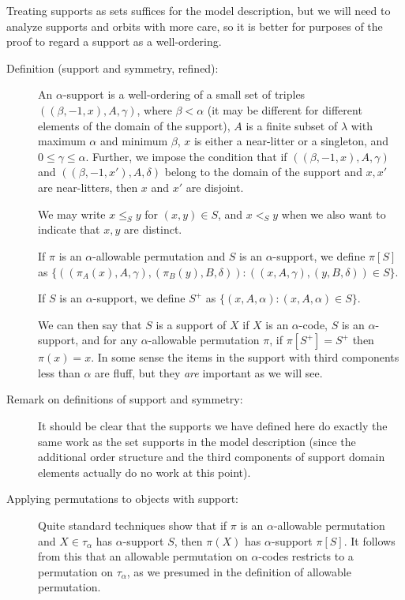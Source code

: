 Treating supports as sets suffices for the model description, but we will need to analyze supports and orbits with more care, so it is better for purposes
of the proof to regard a support as a well-ordering.

\begin{description}

\item[Definition (support and symmetry, refined):]  An $\alpha$-support is a well-ordering of a small set of triples $((\beta,-1,x),A,\gamma)$, where $\beta<\alpha$ (it may be different for different elements of the domain of the support), $A$ is a finite subset of $\lambda$ with maximum $\alpha$ and minimum $\beta$, $x$ is either a near-litter or a singleton, and $0 \leq \gamma \leq\alpha$.  Further, we impose the condition that if $((\beta,-1,x),A,\gamma)$ and $((\beta,-1,x'),A,\delta)$ belong to the domain of the support and $x,x'$ are near-litters, then $x$ and $x'$ are disjoint.

We may write $x \leq_S y$ for $(x,y) \in S$, and $x <_S y$ when we also want to indicate that $x,y$ are distinct.

If $\pi$ is an $\alpha$-allowable permutation and $S$ is an $\alpha$-support, we define $\pi[S]$ as $\{((\pi_A(x),A,\gamma),(\pi_B(y),B,\delta)):((x,A,\gamma),(y,B,\delta))\in S\}$.

If $S$ is an $\alpha$-support, we define $S^+$ as $\{(x,A,\alpha):(x,A,\alpha) \in S\}$.

We can then say that $S$ is a support of $X$ if $X$ is an $\alpha$-code, $S$ is an $\alpha$-support, and for any $\alpha$-allowable permutation $\pi$, if $\pi[S^+]=S^+$ then $\pi(x)=x$.  In some sense the items in the support with third components less than $\alpha$ are fluff, but they {\em are\/} important as we will see.

\item[Remark on definitions of support and symmetry:]  It should be clear that the supports we have defined here do exactly the same work as the set supports in the model description (since the additional order structure and the third components of support domain elements actually do no work at this point).

\item[Applying permutations to objects with support:]  Quite standard techniques show that if $\pi$ is an $\alpha$-allowable permutation and $X \in \tau_\alpha$ has $\alpha$-support $S$, then $\pi(X)$ has $\alpha$-support $\pi[S]$.  It follows from this that an allowable permutation on $\alpha$-codes restricts to a permutation on $\tau_\alpha$, as we presumed in the definition of allowable permutation.


\end{description}

